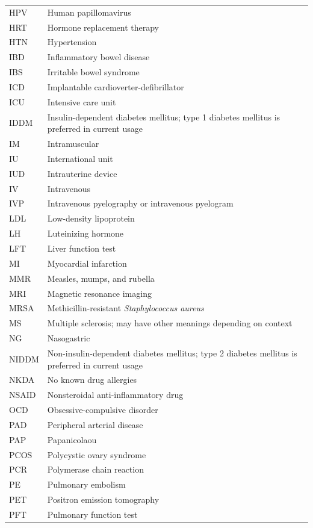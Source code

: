 \begin{longtable}{>{\raggedright\arraybackslash}p{} >{\raggedright\arraybackslash}p{}}
HPV & Human papillomavirus \\
HRT & Hormone replacement therapy \\
HTN & Hypertension \\
IBD & Inflammatory bowel disease \\
IBS & Irritable bowel syndrome \\
ICD & Implantable cardioverter-defibrillator \\
ICU & Intensive care unit \\
IDDM & Insulin-dependent diabetes mellitus; type 1 diabetes mellitus is preferred in current usage \\
IM & Intramuscular \\
IU & International unit \\
IUD & Intrauterine device \\
IV & Intravenous \\
IVP & Intravenous pyelography or intravenous pyelogram \\
LDL & Low-density lipoprotein \\
LH & Luteinizing hormone \\
LFT & Liver function test \\
MI & Myocardial infarction \\
MMR & Measles, mumps, and rubella \\
MRI & Magnetic resonance imaging \\
MRSA & Methicillin-resistant \textit{Staphylococcus aureus} \\
MS & Multiple sclerosis; may have other meanings depending on context \\
NG & Nasogastric \\
NIDDM & Non-insulin-dependent diabetes mellitus; type 2 diabetes mellitus is preferred in current usage \\
NKDA & No known drug allergies \\
NSAID & Nonsteroidal anti-inflammatory drug \\
OCD & Obsessive-compulsive disorder \\
PAD & Peripheral arterial disease \\
PAP & Papanicolaou \\
PCOS & Polycystic ovary syndrome \\
PCR & Polymerase chain reaction \\
PE & Pulmonary embolism \\
PET & Positron emission tomography \\
PFT & Pulmonary function test \\

\end{longtable}

